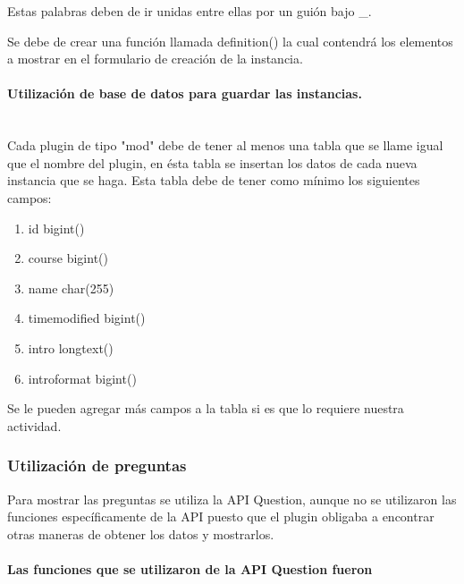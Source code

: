 			Estas palabras deben de ir unidas entre ellas por un guión bajo \_.

		Se debe de crear una función llamada definition() la cual contendrá los elementos a mostrar en el formulario de creación de la instancia.

    \paragraph{Utilización de base de datos para guardar las instancias.}\mbox{}\\

			Cada plugin de tipo "mod" debe de tener al menos una tabla que se llame igual que el nombre del plugin, en ésta tabla se insertan los datos de cada nueva instancia que se haga. Esta tabla debe de tener como mínimo los siguientes campos:
      \begin{enumerate}
        \item id bigint()
        \item course bigint()
        \item name char(255)
        \item timemodified bigint()
        \item intro longtext()
        \item introformat bigint()
      \end{enumerate}

        Se le pueden agregar más campos a la tabla si es que lo requiere nuestra actividad.

    \subsubsection{Utilización de preguntas}

		Para mostrar las preguntas se utiliza la API Question, aunque no se utilizaron las funciones específicamente de la API puesto que el plugin obligaba a encontrar otras maneras de obtener los datos y mostrarlos.

    \paragraph{Las funciones que se utilizaron de la API Question fueron}\mbox{}\\

